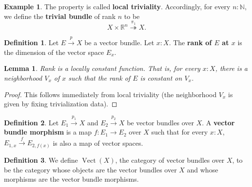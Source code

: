 \documentclass[11pt]{article}
\newcommand{\R}{\mathbb{R}}
\newcommand{\remph}[1]{\textcolor{red}{#1}}
\newcommand{\TODO}{\remph{TODO}}
\newcommand{\Vect}{\operatorname{Vect}}
\theoremstyle{plain}
\newtheorem{lemma}{Lemma}[section]
\theoremstyle{definition}
\newtheorem{definition}{Definition}[section]
\newtheorem{example}{Example}[section]
\newcommand{\N}{\mathbb{N}}
\begin{document}
\begin{example}\label{example-trivial-bundle}
  The property  is called \textbf{local triviality}. Accordingly, for every \(n : \N\), we define the \textbf{trivial bundle} of rank \(n\) to be
  \[
    X \times \R^n \overset{\pi_1}{\twoheadrightarrow} X.
  \]
\end{example}



\begin{definition}\label{def:rank}
  Let \(E \overset{p}{\to} X\) be a vector bundle. Let \(x : X\). The \textbf{rank of \(E\) at \(x\)} is the dimension of the vector space \(E_x\).
\end{definition}

\begin{lemma}\label{lemma:rank-locally-constant}
  Rank is a locally constant function. That is, for every \(x : X\), there is a neighborhood \(V_{x}\) of \(x\) such that the rank of \(E\) is constant on \(V_x\).
\end{lemma}

\begin{proof}
  This follows immediately from local triviality (the neighborhood \(V_{x}\) is given by fixing trivialization data).
\end{proof}

\begin{definition} \label{def:vector-bundle-homomorphism}
  Let \(E_1 \overset{p_1}{\to} X\) and \(E_2 \overset{p_2}{\to} X\) be vector bundles over \(X\).
  A \textbf{vector bundle morphism} is a map \(f : E_1 \to E_2\) over \(X\) such that for every \(x : X\), \(E_{1,x} \overset{f}{\to} E_{2,f(x)}\) is also a map of vector spaces.
\end{definition}

\begin{definition} \label{def:category-vector-bundles}
  We define \(\Vect(X)\), the category of vector bundles over \(X\), to be the category whose objects are the vector bundles over \(X\) and whose morphisms are the vector bundle morphisms.
\end{definition}
\end{document}
